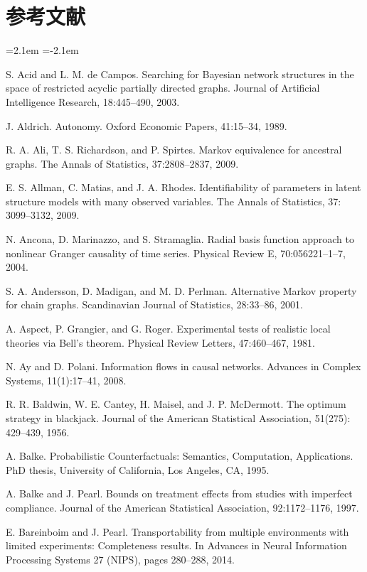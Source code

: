 \chapter*{参考文献}
\begingroup
\small\raggedright
\begin{list}{}{\leftmargin=2.1em
 \itemindent=-2.1em\parsep=0pt\itemsep=3pt}
\item S. Acid and L. M. de Campos. Searching for Bayesian network structures in the space of restricted acyclic partially directed graphs. Journal of Artificial Intelligence Research, 18:445--490, 2003.
\item J. Aldrich. Autonomy. Oxford Economic Papers, 41:15--34, 1989.
\item R. A. Ali, T. S. Richardson, and P. Spirtes. Markov equivalence for ancestral graphs. The Annals of Statistics, 37:2808--2837, 2009.
\item E. S. Allman, C. Matias, and J. A. Rhodes. Identifiability of parameters in latent structure models with many observed variables. The Annals of Statistics, 37: 3099--3132, 2009.
\item N. Ancona, D. Marinazzo, and S. Stramaglia. Radial basis function approach to nonlinear Granger causality of time series. Physical Review E, 70:056221--1--7, 2004.
\item S. A. Andersson, D. Madigan, and M. D. Perlman. Alternative Markov property for chain graphs. Scandinavian Journal of Statistics, 28:33--86, 2001.
\item A. Aspect, P. Grangier, and G. Roger. Experimental tests of realistic local theories via Bell's theorem. Physical Review Letters, 47:460--467, 1981.
\item N. Ay and D. Polani. Information flows in causal networks. Advances in Complex Systems, 11(1):17--41, 2008.
\item R. R. Baldwin, W. E. Cantey, H. Maisel, and J. P. McDermott. The optimum strategy in blackjack. Journal of the American Statistical Association, 51(275): 429--439, 1956.
\item A. Balke. Probabilistic Counterfactuals: Semantics, Computation, Applications. PhD thesis, University of California, Los Angeles, CA, 1995.
\item A. Balke and J. Pearl. Bounds on treatment effects from studies with imperfect compliance. Journal of the American Statistical Association, 92:1172--1176, 1997.
\item E. Bareinboim and J. Pearl. Transportability from multiple environments with limited experiments: Completeness results. In Advances in Neural Information Processing Systems 27 (NIPS), pages 280--288, 2014.

\end{list}
